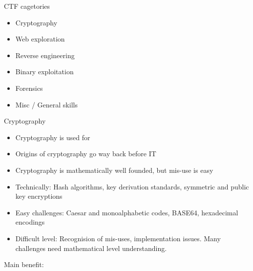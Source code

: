 \documentclass[12 pt]{beamer}
\begin{document}

\begin{frame}{CTF cagetories}

    \begin{itemize}
      \item{Cryptography}

      \bigskip

      \item{Web exploration}

      \bigskip

      \item{Reverse engineering}

      \bigskip

      \item{Binary exploitation}

      \bigskip

      \item{Forensics}

      \bigskip

      \item{Misc / General skills}
    \end{itemize}

\end{frame}


\begin{frame}{Cryptography}

  \begin{itemize}
    \item{Cryptography is used for }
    \item{Origins of cryptography go way back before IT}
    \item{Cryptography is mathematically well founded, but mis-use is easy}
    \item{Technically: Hash algorithms, key derivation standards, symmetric and public key encryptions}
    \item{Easy challenges: Caesar and monoalphabetic codes, BASE64, hexadecimal encodings}
    \item{Difficult level: Recognision of mis-uses, implementation issues. Many challenges need mathematical level understanding.}
  \end{itemize}

  \begin{exampleblock}{}
    Main benefit: 
  \end{exampleblock}

\end{frame}
\end{document}
